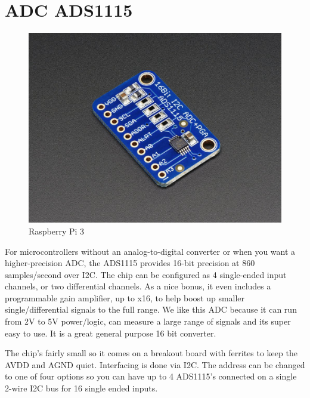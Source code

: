 \section{ADC ADS1115}{
\begin{figure}[H]
		\includegraphics[scale=0.5]{images/ads1115.jpg}
		\centering
		\caption{Raspberry Pi 3}
		\label{trans}
	\end{figure}

For microcontrollers without an analog-to-digital converter or when you want a higher-precision ADC, the ADS1115 provides 16-bit precision at 860 samples/second over I2C. The chip can be configured as 4 single-ended input channels, or two differential channels. As a nice bonus, it even includes a programmable gain amplifier, up to x16, to help boost up smaller single/differential signals to the full range. We like this ADC because it can run from 2V to 5V power/logic, can measure a large range of signals and its super easy to use. It is a great general purpose 16 bit converter.

The chip's fairly small so it comes on a breakout board with ferrites to keep the AVDD and AGND quiet. Interfacing is done via I2C. The address can be changed to one of four options so you can have up to 4 ADS1115's connected on a single 2-wire I2C bus for 16 single ended inputs.

}
